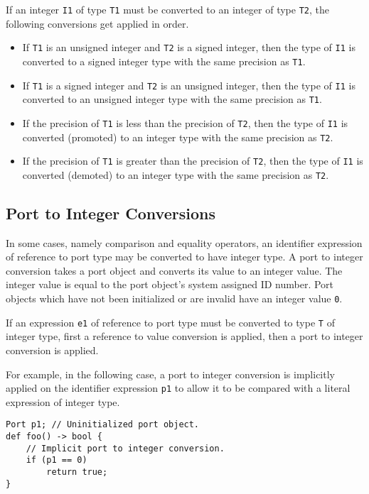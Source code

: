 If an integer \texttt{I1} of type \texttt{T1} must be converted to an integer of type \texttt{T2}, the following conversions get applied in order.

\begin{itemize}
\item If \texttt{T1} is an unsigned integer and \texttt{T2} is a signed integer, then the type of \texttt{I1} is converted to a signed integer type with the same precision as \texttt{T1}.

\item If \texttt{T1} is a signed integer and \texttt{T2} is an unsigned integer, then the type of \texttt{I1} is converted to an unsigned integer type with the same precision as \texttt{T1}.

\item If the precision of \texttt{T1} is less than the precision of \texttt{T2}, then the type of \texttt{I1} is converted (promoted) to an integer type with the same precision as \texttt{T2}.

\item If the precision of \texttt{T1} is greater than the precision of \texttt{T2}, then the type of \texttt{I1} is converted (demoted) to an integer type with the same precision as \texttt{T2}.
\end{itemize}

\subsection{Port to Integer Conversions} \label{port_conv}

In some cases, namely comparison and equality operators, an identifier expression of reference to port type may be converted to have integer type. A port to integer conversion takes a port object and converts its value to an integer value. The integer value is equal to the port object's system assigned ID number. Port objects which have not been initialized or are invalid have an integer value \texttt{0}.

If an expression \texttt{e1} of reference to port type must be converted to type \texttt{T} of integer type, first a reference to value conversion is applied, then a port to integer conversion is applied.

For example, in the following case, a port to integer conversion is implicitly applied on the identifier expression \texttt{p1} to allow it to be compared with a literal expression of integer type.

\noindent\begin{minipage}{\linewidth}
\begin{lstlisting}
Port p1; // Uninitialized port object.
def foo() -> bool {
	// Implicit port to integer conversion.
	if (p1 == 0)
		return true;
}
\end{lstlisting}
\end{minipage}

